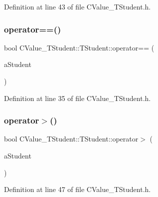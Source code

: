 Definition at line 43 of file C\+Value\+\_\+\+T\+Student.\+h.

\mbox{\label{struct_c_value___t_student_1_1_t_student_ac12071cfbbb72f3666833d7da227f052}} 
\subsubsection{\texorpdfstring{operator==()}{operator==()}}
{\footnotesize\ttfamily bool C\+Value\+\_\+\+T\+Student\+::\+T\+Student\+::operator== (\begin{DoxyParamCaption}\item[{const \hyperlink{struct_c_value___t_student_1_1_t_student}{T\+Student} \&}]{a\+Student }\end{DoxyParamCaption})\hspace{0.3cm}{\ttfamily [inline]}}



Definition at line 35 of file C\+Value\+\_\+\+T\+Student.\+h.

\mbox{\label{struct_c_value___t_student_1_1_t_student_ae31809572b52d475b4e891b2a4acaafd}} 
\subsubsection{\texorpdfstring{operator$>$()}{operator>()}}
{\footnotesize\ttfamily bool C\+Value\+\_\+\+T\+Student\+::\+T\+Student\+::operator$>$ (\begin{DoxyParamCaption}\item[{const \hyperlink{struct_c_value___t_student_1_1_t_student}{T\+Student} \&}]{a\+Student }\end{DoxyParamCaption})\hspace{0.3cm}{\ttfamily [inline]}}



Definition at line 47 of file C\+Value\+\_\+\+T\+Student.\+h.



